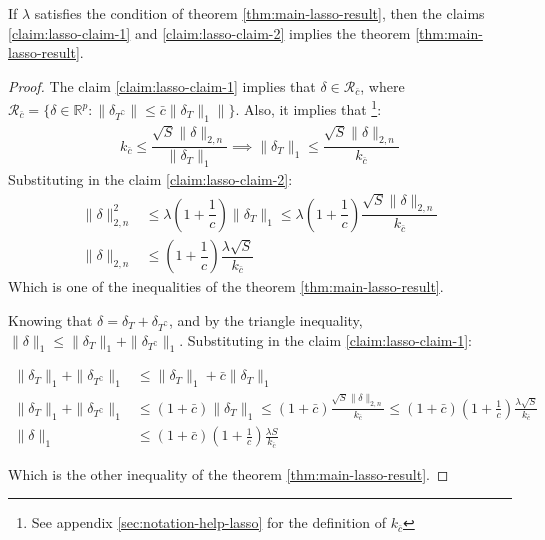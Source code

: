 \begin{claim}
If $\lambda$ satisfies the condition of theorem \ref{thm:main-lasso-result}, then the claims \ref{claim:lasso-claim-1} and \ref{claim:lasso-claim-2} implies the theorem \ref{thm:main-lasso-result}.
\end{claim}
\begin{proof}[Proof]
    The claim \ref{claim:lasso-claim-1} implies that $\delta \in \mathcal{R}_{\bar{c}}$, where $\mathcal{R}_{\bar{c}} = \{\delta \in \mathbb{R}^p: \|\delta_{T^\complement}\| \leq \bar{c} \|\delta_T\|_1\|\}$. Also, it implies that \footnote{See appendix \ref{sec:notation-help-lasso} for the definition of $k_{\bar{c}}$}:
    \begin{align*}
        k_{\bar{c}} 
        \leq
        \dfrac{\sqrt{S} \|\delta\|_{2,n}}{\|\delta_T\|_1}
        \implies
        \|\delta_T\|_1
        \leq
        \dfrac{\sqrt{S} \|\delta\|_{2,n}}{k_{\bar{c}}}
    \end{align*}
    Substituting in the claim \ref{claim:lasso-claim-2}:
    \begin{align*}
        \|\delta\|_{2, n}^{2}
        &\leq
        \lambda \left(
            1 + \dfrac{1}{c}
        \right) \|\delta_T\|_{1}
        \leq
        \lambda \left(
            1 + \dfrac{1}{c}
        \right) \dfrac{\sqrt{S} \|\delta\|_{2,n}}{k_{\bar{c}}}\\
        \|\delta\|_{2, n}
        &\leq
        \left(1 + \dfrac{1}{c}\right)
        \dfrac{\lambda \sqrt{S}}{k_{\bar{c}}}
    \end{align*}
    Which is one of the inequalities of the theorem \ref{thm:main-lasso-result}. 

    Knowing that $\delta = \delta_T + \delta_{T^\complement}$, and by the triangle inequality, $\|\delta\|_1 \leq \|\delta_T\|_1 + \|\delta_{T^\complement}\|_1$. Substituting in the claim \ref{claim:lasso-claim-1}:

    \begin{align*}
        \|\delta_T\|_1 + \|\delta_{T^\complement}\|_1
        &\leq
        \|\delta_T\|_1 + \bar{c} \|\delta_T\|_1\\
        \|\delta_T\|_1 + \|\delta_{T^\complement}\|_1
        &\leq
        (1 + \bar{c}) \|\delta_T\|_1
        \leq 
        (1 + \bar{c}) \frac{\sqrt{S} \|\delta\|_{2, n}}{k_{\bar{c}}}
        \leq 
        (1 + \bar{c}) (1 + \frac{1}{c}) \frac{\lambda \sqrt{S}}{k_{\bar{c}}}\\
        \|\delta\|_1
        &\leq 
        (1 + \bar{c}) (1 + \frac{1}{c}) \frac{\lambda S}{k_{\bar{c}}}
    \end{align*}

    Which is the other inequality of the theorem \ref{thm:main-lasso-result}.
\end{proof}